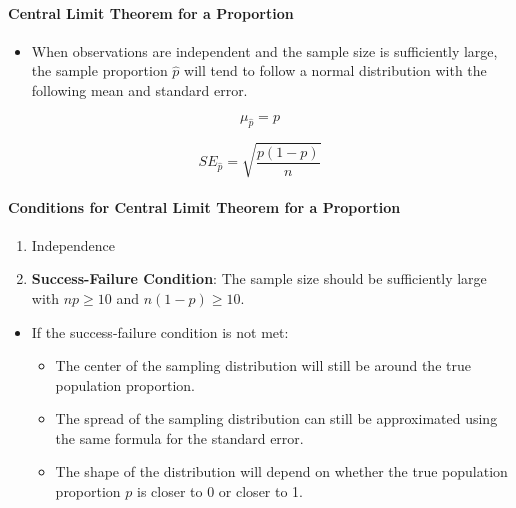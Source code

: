 \documentclass[]{book}
\providecommand{\tightlist}{%
  \setlength{\itemsep}{0pt}\setlength{\parskip}{0pt}}
\let\oldparagraph\paragraph
\renewcommand{\paragraph}[1]{\oldparagraph{#1}\mbox{}}
\begin{document}
\hypertarget{central-limit-theorem-for-a-proportion-1}{%
\paragraph{Central Limit Theorem for a Proportion}\label{central-limit-theorem-for-a-proportion-1}}

\begin{itemize}
\tightlist
\item
  When observations are independent and the sample size is sufficiently large, the sample proportion \(\hat{p}\) will tend to follow a normal distribution with the following mean and standard error.
\end{itemize}

\[
\mu_{\hat{p}} = p
\]

\[
SE_{\hat{p}} = \sqrt{\frac{p(1-p)}{n}}
\]

\hypertarget{conditions-for-central-limit-theorem-for-a-proportion}{%
\paragraph{Conditions for Central Limit Theorem for a Proportion}\label{conditions-for-central-limit-theorem-for-a-proportion}}

\begin{enumerate}
\def\labelenumi{\arabic{enumi}.}
\tightlist
\item
  Independence
\item
  \textbf{Success-Failure Condition}: The sample size should be sufficiently large with \(np \ge 10\) and \(n(1-p) \ge 10\).
\end{enumerate}

\begin{itemize}
\tightlist
\item
  If the success-failure condition is not met:

  \begin{itemize}
  \tightlist
  \item
    The center of the sampling distribution will still be around the true population proportion.
  \item
    The spread of the sampling distribution can still be approximated using the same formula for the standard error.
  \item
    The shape of the distribution will depend on whether the true population proportion \(p\) is closer to 0 or closer to 1.
  \end{itemize}
\end{itemize}
\end{document}
